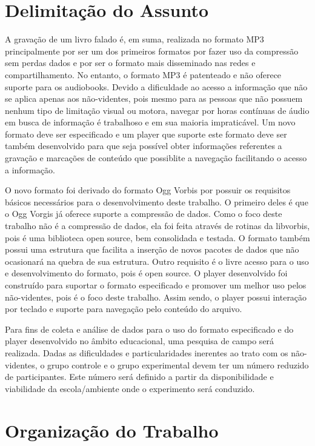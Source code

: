 \section{Delimitação do Assunto}

A gravação de um livro falado é, em suma, realizada no formato MP3 principalmente por ser um dos primeiros formatos por fazer uso da compressão sem perdas dados e por ser o formato mais disseminado nas redes e compartilhamento. No entanto, o formato MP3 é patenteado e não oferece suporte para os audiobooks. Devido a dificuldade ao acesso a informação que não se aplica apenas aos não-videntes, pois mesmo para as pessoas que não possuem nenhum tipo de limitação visual ou motora, navegar por horas contínuas de áudio em busca de informação é trabalhoso e em sua maioria impraticável. Um novo formato deve ser especificado e um player que suporte este formato deve ser também desenvolvido para que seja possível obter informações referentes a gravação e marcações de conteúdo que possiblite a navegação facilitando o acesso a informação.

O novo formato foi derivado do formato Ogg Vorbis por possuir os requisitos básicos necessários para o desenvolvimento deste trabalho. O primeiro deles é que o Ogg Vorgis já oferece suporte a compressão de dados. Como o foco deste trabalho não é a compressão de dados, ela foi feita através de rotinas da libvorbis, pois é uma biblioteca open source, bem consolidada e testada. O formato também possui uma estrutura que facilita a inserção de novos pacotes de dados que não ocasionará na quebra de sua estrutura. Outro requisito é o livre acesso para o uso e desenvolvimento do formato, pois é open source. O player desenvolvido foi construído para suportar o formato especificado e promover um melhor uso pelos não-videntes, pois é o foco deste trabalho. Assim sendo, o player possui interação por teclado e suporte para navegação pelo conteúdo do arquivo.

Para fins de coleta e análise de dados para o uso do formato especificado e do player desenvolvido no âmbito educacional, uma pesquisa de campo será realizada. Dadas as dificuldades e particularidades inerentes ao trato com os não-videntes, o grupo controle e o grupo experimental devem ter um número reduzido de participantes. Este número será definido a partir da disponibilidade e viabilidade da escola/ambiente onde o experimento será conduzido.


\section{Organização do Trabalho}

